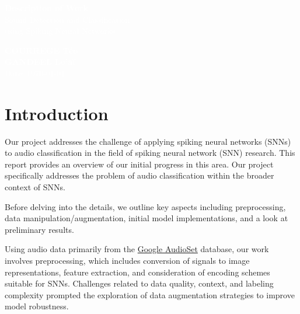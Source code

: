\documentclass[11pt]{article}
\begin{document}
\pagecolor{darkbluegrey}
\afterpage{\nopagecolor}


\begin{titlepage}
  \begin{center}
    \textcolor{white}{\textbf{\Huge Description of Work}}\\ %
    \vspace{1cm}
    \textcolor{white}{\Large Sound Detection and Classification\\using Spiking Neural Networks} %
    \vspace{3cm}
  \end{center}
  \begin{center}
    \textcolor{white}{ %
      \textbf{COURREGE Téo}\\
      \textbf{GANDEEL Lo'aï}\\
      \vspace{1cm}
      \Large Date: \today}
  \end{center}
\end{titlepage}

\newpage

\tableofcontents

\pagebreak

\section{Introduction}

Our project addresses the challenge of applying spiking neural networks (SNNs) to audio classification in the field of spiking neural network (SNN) research. This report provides an overview of our initial progress in this area. Our project specifically addresses the problem of audio classification within the broader context of SNNs.

Before delving into the details, we outline key aspects including preprocessing, data manipulation/augmentation, initial model implementations, and a look at preliminary results.

Using audio data primarily from the \href{https://research.google.com/audioset/}{Google AudioSet} database, our work involves preprocessing, which includes conversion of signals to image representations, feature extraction, and consideration of encoding schemes suitable for SNNs. Challenges related to data quality, context, and labeling complexity prompted the exploration of data augmentation strategies to improve model robustness.
\end{document}
